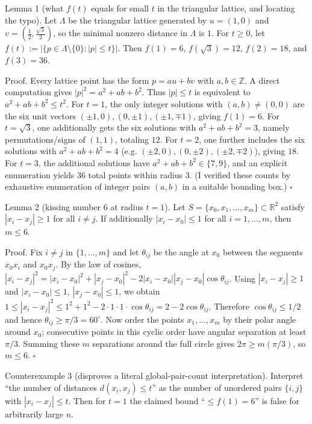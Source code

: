 Lemma 1 (what $f(t)$ equals for small $t$ in the triangular lattice, and locating the typo).
Let $\Lambda$ be the triangular lattice generated by $u=(1,0)$ and $v=(\tfrac12,\tfrac{\sqrt3}{2})$, so the minimal nonzero distance in $\Lambda$ is $1$.
For $t\ge 0$, let
$f(t):=|\{p\in \Lambda\setminus\{0\}: |p|\le t\}|$. Then
$f(1)=6$, $f(\sqrt3)=12$, $f(2)=18$, and $f(3)=36$.

Proof.
Every lattice point has the form $p=a u + b v$ with $a,b\in\mathbb{Z}$. A direct computation gives
$|p|^2 = a^2 + ab + b^2$.
Thus $|p|\le t$ is equivalent to $a^2+ab+b^2\le t^2$.
For $t=1$, the only integer solutions with $(a,b)\neq (0,0)$ are the six unit vectors $(\pm1,0),(0,\pm1),(\pm1,\mp1)$, giving $f(1)=6$.
For $t=\sqrt3$, one additionally gets the six solutions with $a^2+ab+b^2=3$, namely permutations/signs of $(1,1)$, totaling $12$.
For $t=2$, one further includes the six solutions with $a^2+ab+b^2=4$ (e.g. $(\pm2,0),(0,\pm2),(\pm2,\mp2)$), giving $18$.
For $t=3$, the additional solutions have $a^2+ab+b^2\in\{7,9\}$, and an explicit enumeration yields $36$ total points within radius $3$.
(I verified these counts by exhaustive enumeration of integer pairs $(a,b)$ in a suitable bounding box.) $\square$

Lemma 2 (kissing number $6$ at radius $t=1$).
Let $S=\{x_0,x_1,\ldots,x_m\}\subset\mathbb{R}^2$ satisfy $|x_i-x_j|\ge 1$ for all $i\neq j$.
If additionally $|x_i-x_0|\le 1$ for all $i=1,\ldots,m$, then $m\le 6$.

Proof.
Fix $i\neq j$ in $\{1,\ldots,m\}$ and let $\theta_{ij}$ be the angle at $x_0$ between the segments $x_0x_i$ and $x_0x_j$.
By the law of cosines,
$|x_i-x_j|^2 = |x_i-x_0|^2 + |x_j-x_0|^2 -2|x_i-x_0||x_j-x_0|\cos\theta_{ij}$.
Using $|x_i-x_j|\ge 1$ and $|x_i-x_0|\le 1$, $|x_j-x_0|\le 1$, we obtain
$1 \le |x_i-x_j|^2 \le 1^2+1^2 - 2\cdot 1\cdot 1\cdot \cos\theta_{ij} = 2-2\cos\theta_{ij}$.
Therefore $\cos\theta_{ij}\le 1/2$ and hence $\theta_{ij}\ge \pi/3=60^\circ$.
Now order the points $x_1,\ldots,x_m$ by their polar angle around $x_0$; consecutive points in this cyclic order have angular separation at least $\pi/3$.
Summing these $m$ separations around the full circle gives $2\pi \ge m(\pi/3)$, so $m\le 6$. $\square$

Counterexample 3 (disproves a literal global-pair-count interpretation).
Interpret ``the number of distances $d(x_i,x_j)\le t$'' as the number of unordered pairs $\{i,j\}$ with $|x_i-x_j|\le t$.
Then for $t=1$ the claimed bound ``$\le f(1)=6$'' is false for arbitrarily large $n$.


